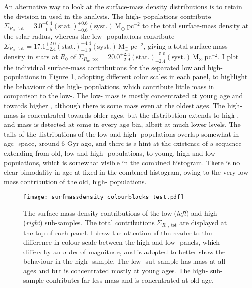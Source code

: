 An alternative way to look at the surface-mass density distributions is to retain the division in \afe{} used in the analysis. The high-\afe{} populations contribute $\Sigma_{R_0,\ \mathrm{tot}} = 3.0_{-0.5}^{+0.4}\mathrm{(stat.)}_{-0.6}^{+0.6}\mathrm{(syst.)}\ \mathrm{M_{\odot}\ pc^{-2}}$ to the total surface-mass density at the solar radius, whereas the low-\afe{} populations contribute $\Sigma_{R_0,\ \mathrm{tot}} = 17.1_{-2.4}^{+2.0}\mathrm{(stat.)}_{-1.9}^{+4.4}\mathrm{(syst.)}\ \mathrm{M_{\odot}\ pc^{-2}}$, giving a total surface-mass density in stars at $R_0$ of $\Sigma_{R_0,\ \mathrm{tot}} = 20.0_{-2.9}^{+2.4}\mathrm{(stat.)}_{-2.4}^{+5.0}\mathrm{(syst.)}\ \mathrm{M_{\odot}\ pc^{-2}}$. I plot the individual surface-mass contributions for the separated low and high-\afe{} populations in Figure \ref{fig:massafe}, adopting different color scales in each panel, to highlight the behaviour of the high-\afe{} populations, which contribute little mass in comparison to the low-\afe{}. The low-\afe{} mass is mostly concentrated at young age and towards higher \feh{}, although there is some mass even at the oldest ages. The high-\afe{} mass is concentrated towards older ages, but the distribution extends to high \feh{}, and mass is detected at some \feh{} in every age bin, albeit at much lower levels. The tails of the distributions of the low and high-\afe{} populations overlap somewhat in age-\feh{} space, around 6 Gyr ago, and there is a hint at the existence of a sequence extending from old, low \feh{} and high-\afe{} populations, to young, high \feh{} and low-\afe{} populations, which is somewhat visible in the combined histogram. There is no clear bimodality in age at fixed \feh{} in the combined histogram, owing to the very low mass contribution of the old, high-\afe{} populations. 

\begin{figure}
\texttt{[image: surfmassdensity\_colourblocks\_test.pdf]}
 	\centering
     \caption[The separated surface mass density contributions of mono-age, mono-\feh{} populations in the low and high-\afe{} populations]{The surface-mass density contributions of the low (\emph{left}) and high (\emph{right}) \afe{} sub-samples. The total contributions $\Sigma_{R_0,\ \mathrm{tot}}$ are displayed at the top of each panel. I draw the attention of the reader to the difference in colour scale between the high and low-\afe{} panels, which differs by an order of magnitude, and is adopted to better show the behaviour in the high-\afe{} sample. The low-\afe{} sub-sample has mass at all ages and \feh{} but is concentrated mostly at young ages. The high-\afe{} sub-sample contributes far less mass and is concentrated at old age.}
     \label{fig:massafe}
\end{figure}


